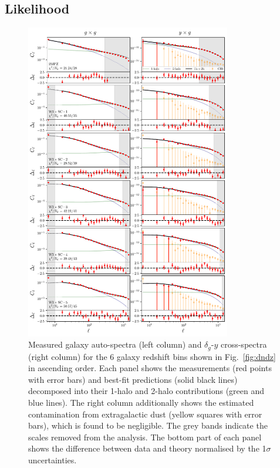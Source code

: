 \documentclass[useAMS,usenatbib]{mn2e}
\begin{document}
  \subsection{Likelihood}\label{ssec:methods.like} 
  \begin{figure}
    \centering
    \includegraphics[width=0.8\textwidth]{fits.pdf}
    \caption{Measured galaxy auto-spectra (left column) and $\delta_g$-$y$ cross-spectra (right column) for the 6 galaxy redshift bins shown in Fig.\!~\ref{fig:dndz} in ascending order. Each panel shows the measurements (red points with error bars) and best-fit predictions (solid black lines) decomposed into their 1-halo and 2-halo contributions (green and blue lines). The right column additionally shows the estimated contamination from extragalactic dust (yellow squares with error bars), which is found to be negligible. The grey bands indicate the scales removed from the analysis. The bottom part of each panel shows the difference between data and theory normalised by the 1$\sigma$ uncertainties.}
    \label{fig:cls}
  \end{figure}
\end{document}
